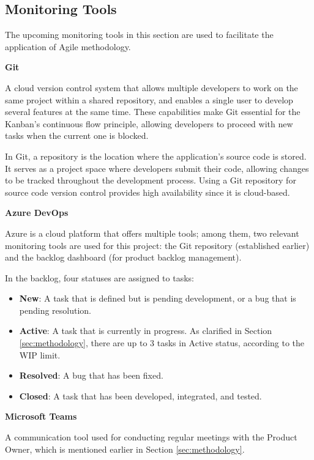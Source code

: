 \subsection{Monitoring Tools}
\label{sec:monitoring-tools}

The upcoming monitoring tools in this section are used to facilitate the application of Agile methodology. 

\textbf{Git}

A cloud version control system that allows multiple developers to work on the same project within a shared repository, and enables a single user to develop several features at the same time. These capabilities make Git essential for the Kanban's continuous flow principle, allowing developers to proceed with new tasks when the current one is blocked.

In Git, a repository is the location where the application's source code is stored. It serves as a project space where developers submit their code, allowing changes to be tracked throughout the development process. Using a Git repository for source code version control provides high availability since it is cloud-based.

\newpage

\textbf{Azure DevOps}

Azure is a cloud platform that offers multiple tools; among them, two relevant monitoring tools are used for this project: the Git repository (established earlier) and the backlog dashboard (for product backlog management).  

In the backlog, four statuses are assigned to tasks:

\begin{itemize} [leftmargin=0.75cm, itemsep=0.5pt, label=\textbullet]
    \item \textbf{New}: A task that is defined but is pending development, or a bug that is pending resolution.
    \item \textbf{Active}: A task that is currently in progress. As clarified in Section \ref{sec:methodology}, there are up to 3 tasks in Active status, according to the WIP limit.
    \item \textbf{Resolved}: A bug that has been fixed.
    \item \textbf{Closed}: A task that has been developed, integrated, and tested.
\end{itemize}

\vspace{5pt}

\textbf{Microsoft Teams}

A communication tool used for conducting regular meetings with the Product Owner, which is mentioned earlier in Section \ref{sec:methodology}.

